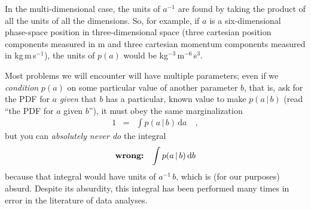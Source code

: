 \documentclass[12pt,twoside]{article}
\newcounter{problem}
\newcommand{\dd}{\mathrm{d}}
\newcommand{\given}{\,|\,}
\begin{document}
In the multi-dimensional case, the units of $a^{-1}$ are found by
taking the product of all the units of all the dimensions.  So, for
example, if $a$ is a six-dimensional phase-space position in
three-dimensional space (three cartesian position components measured
in m and three cartesian momentum components measured in
kg\,m\,s$^{-1}$), the units of $p(a)$ would be
kg$^{-3}$\,m$^{-6}$\,s$^3$.

Most problems we will encounter will have multiple parameters; even if
we \emph{condition} $p(a)$ on some particular value of another
parameter $b$, that is, ask for the PDF for $a$ \emph{given} that $b$
has a particular, known value to make $p(a \given b)$ (read ``the PDF
for $a$ given $b$''), it must obey the same marginalization
\begin{eqnarray}\displaystyle
1 &=& \int p(a \given b)\,\dd a
\quad ,
\end{eqnarray}
but you can \emph{absolutely never do} the integral
\begin{eqnarray}\displaystyle
\mbox{\textbf{wrong:}} & & \int p(a \given b)\,\dd b
\end{eqnarray}
because that integral would have units of $a^{-1}\,b$, which is (for
our purposes) absurd.  Despite its absurdity, this integral has been
performed many times in error in the literature of data analyses.
\end{document}

